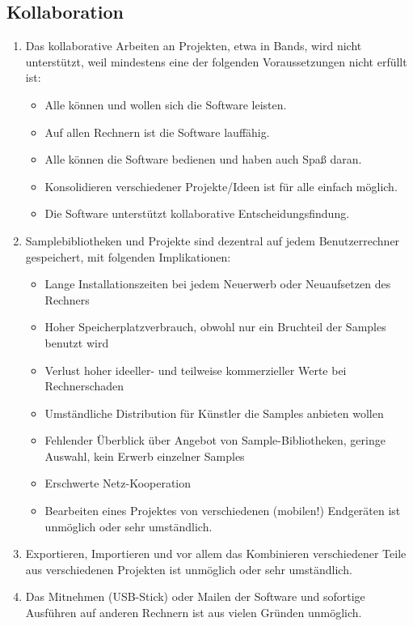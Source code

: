 \documentclass[12pt]{article}
\begin{document}
\subsection{Kollaboration}

\begin{enumerate}
\item Das kollaborative Arbeiten an Projekten, etwa in Bands, wird nicht unterst\"{u}tzt, weil mindestens eine der folgenden Voraussetzungen nicht erf\"{u}llt ist:
\begin{itemize}
\item Alle k\"{o}nnen und wollen sich die Software leisten.
\item Auf allen Rechnern ist die Software lauff\"{a}hig.
\item Alle k\"{o}nnen die Software bedienen und haben auch Spa{\ss} daran.
\item Konsolidieren verschiedener Projekte/Ideen ist f\"{u}r alle einfach m\"{o}glich.
\item Die Software unterst\"{u}tzt kollaborative Entscheidungsfindung.
\end{itemize}
\item Samplebibliotheken und Projekte sind dezentral auf jedem Benutzerrechner gespeichert, mit folgenden Implikationen:
\begin{itemize}
\item Lange Installationszeiten bei jedem Neuerwerb oder Neuaufsetzen des Rechners
\item Hoher Speicherplatzverbrauch, obwohl nur ein Bruchteil der Samples benutzt wird
\item Verlust hoher ideeller- und teilweise kommerzieller Werte bei Rechnerschaden 
\item Umst\"{a}ndliche Distribution  f\"{u}r K\"{u}nstler die Samples anbieten wollen
\item Fehlender \"{U}berblick \"{u}ber Angebot von Sample-Bibliotheken, geringe Auswahl, kein Erwerb einzelner Samples
\item Erschwerte Netz-Kooperation
\item Bearbeiten eines Projektes von verschiedenen (mobilen!) Endger\"{a}ten ist unm\"{o}glich oder sehr umst\"{a}ndlich.
\end{itemize}
\item Exportieren, Importieren und vor allem das Kombinieren verschiedener Teile aus verschiedenen Projekten ist unm\"{o}glich oder sehr umst\"{a}ndlich.
\item Das Mitnehmen (USB-Stick) oder Mailen der Software und sofortige Ausf\"{u}hren auf anderen Rechnern ist aus vielen Gr\"{u}nden unm\"{o}glich.
\end{enumerate}
\end{document}
